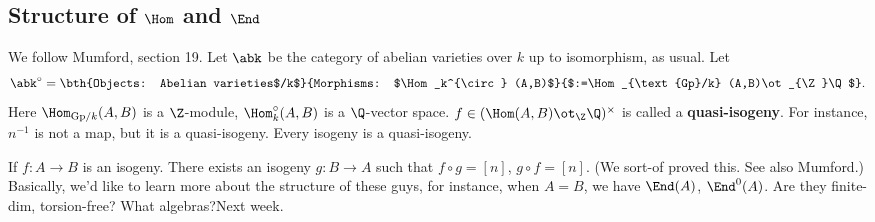 \subsection{Structure of $\Hom$ and $\End$}
We follow Mumford, section 19. %
Let $\abk$ be the category of abelian varieties over $k$ up to isomorphism, as usual. Let
\[
\abk^{\circ}=\bth{Objects: Abelian varieties$/k$}{Morphisms: $\Hom_k^{\circ} (A,B)$}{$:=\Hom_{\text{Gp}/k} (A,B)\ot_{\Z}\Q$}.
\]
Here $\Hom_{\text{Gp}/k}(A,B)$ is a $\Z$-module, $\Hom_k^{\circ}(A,B)$ is a $\Q$-vector space. $f\in (\Hom(A,B)\ot_{\Z} \Q)^{\times}$ is called a \textbf{quasi-isogeny}.  
For instance, $n^{-1}$ is not a map, but it is a quasi-isogeny. Every isogeny is a quasi-isogeny.

If $f:A\to B$ is an isogeny. There exists an isogeny $g:B\to A$ such that $f\circ g=[n]$, $g\circ f=[n]$. (We sort-of proved this. See also Mumford.)
Basically, we'd like to learn more about the structure of these guys, for instance, when $A=B$, we have $\End(A)$, $\End^0(A)$. Are they finite-dim, torsion-free? What algebras?Next week.